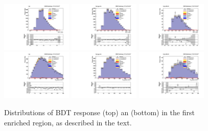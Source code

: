 \begin{figure}[!htpb]\centering
 \includegraphics[width=0.30\textwidth]{plots_and_figures/chapter6/tt_cr/1_preselection_BDT_value.pdf}
 \includegraphics[width=0.30\textwidth]{plots_and_figures/chapter6/tt_cr/21_preselection_BDT_value.pdf} 
 \includegraphics[width=0.30\textwidth]{plots_and_figures/chapter6/tt_cr/22_preselection_BDT_value.pdf} \\
 \includegraphics[width=0.30\textwidth]{plots_and_figures/chapter6/tt_cr/1_preselection_h_collmass_pfmet.pdf}
 \includegraphics[width=0.30\textwidth]{plots_and_figures/chapter6/tt_cr/21_preselection_h_collmass_pfmet.pdf} 
 \includegraphics[width=0.30\textwidth]{plots_and_figures/chapter6/tt_cr/22_preselection_h_collmass_pfmet.pdf} \\


 \caption{Distributions of BDT response (top) an \mcol (bottom) in the first \ttb enriched region, as described in the text.}
 \label{fig:tt_cr}
\end{figure}

